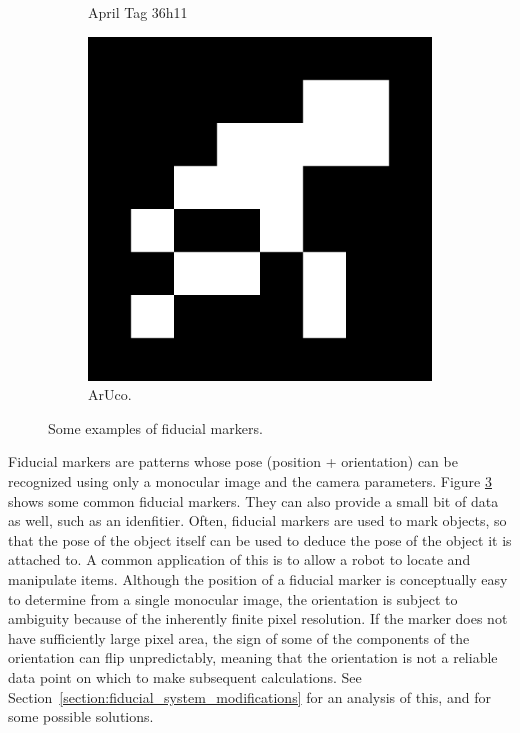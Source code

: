 \begin{figure}[]
\begin{subfigure}[b]{0.2\linewidth}
        \caption{April Tag 36h11}
        \label{figure:apriltag36h11}
    \end{subfigure}
    \begin{subfigure}[b]{0.2\linewidth}
        \includegraphics[width=\textwidth]{images/aruco_33}
        \caption{ArUco.}
        \label{figure:aruco33}
    \end{subfigure}
    \caption{Some examples of fiducial markers.}
    \label{figure:fiducial_markers}
\end{figure}

Fiducial markers are patterns whose pose (position + orientation) can be recognized
using only a monocular image and the camera parameters.
Figure \ref{figure:fiducial_markers} shows some common fiducial markers.
They can also provide a small bit of data as well, such as an idenfitier.
Often, fiducial markers are used to mark objects, so that the pose of the object itself
can be used to deduce the pose of the object it is attached to.
A common application of this is to allow a robot to locate and manipulate items.
Although the position of a fiducial marker is conceptually easy to determine from
a single monocular image, the orientation is subject to ambiguity
because of the inherently finite pixel resolution.
If the marker does not have sufficiently large pixel area, the sign of some of the
components of the orientation can flip unpredictably, meaning that the orientation
is not a reliable data point on which to make subsequent calculations.
See Section~\ref{section:fiducial_system_modifications}
for an analysis of this, and for some possible solutions.
